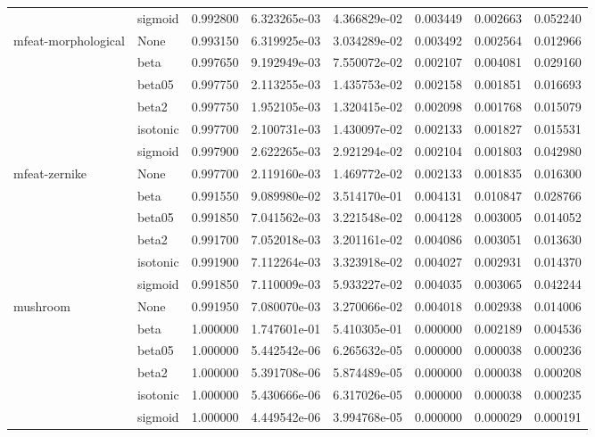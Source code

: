 \begin{tabular}{llrrrrrr}
        & sigmoid &  0.992800 &  6.323265e-03 &  4.366829e-02 &  0.003449 &  0.002663 &  0.052240 \\
mfeat-morphological & None &  0.993150 &  6.319925e-03 &  3.034289e-02 &  0.003492 &  0.002564 &  0.012966 \\
        & beta &  0.997650 &  9.192949e-03 &  7.550072e-02 &  0.002107 &  0.004081 &  0.029160 \\
        & beta05 &  0.997750 &  2.113255e-03 &  1.435753e-02 &  0.002158 &  0.001851 &  0.016693 \\
        & beta2 &  0.997750 &  1.952105e-03 &  1.320415e-02 &  0.002098 &  0.001768 &  0.015079 \\
        & isotonic &  0.997700 &  2.100731e-03 &  1.430097e-02 &  0.002133 &  0.001827 &  0.015531 \\
        & sigmoid &  0.997900 &  2.622265e-03 &  2.921294e-02 &  0.002104 &  0.001803 &  0.042980 \\
mfeat-zernike & None &  0.997700 &  2.119160e-03 &  1.469772e-02 &  0.002133 &  0.001835 &  0.016300 \\
        & beta &  0.991550 &  9.089980e-02 &  3.514170e-01 &  0.004131 &  0.010847 &  0.028766 \\
        & beta05 &  0.991850 &  7.041562e-03 &  3.221548e-02 &  0.004128 &  0.003005 &  0.014052 \\
        & beta2 &  0.991700 &  7.052018e-03 &  3.201161e-02 &  0.004086 &  0.003051 &  0.013630 \\
        & isotonic &  0.991900 &  7.112264e-03 &  3.323918e-02 &  0.004027 &  0.002931 &  0.014370 \\
        & sigmoid &  0.991850 &  7.110009e-03 &  5.933227e-02 &  0.004035 &  0.003065 &  0.042244 \\
mushroom & None &  0.991950 &  7.080070e-03 &  3.270066e-02 &  0.004018 &  0.002938 &  0.014006 \\
        & beta &  1.000000 &  1.747601e-01 &  5.410305e-01 &  0.000000 &  0.002189 &  0.004536 \\
        & beta05 &  1.000000 &  5.442542e-06 &  6.265632e-05 &  0.000000 &  0.000038 &  0.000236 \\
        & beta2 &  1.000000 &  5.391708e-06 &  5.874489e-05 &  0.000000 &  0.000038 &  0.000208 \\
        & isotonic &  1.000000 &  5.430666e-06 &  6.317026e-05 &  0.000000 &  0.000038 &  0.000235 \\
        & sigmoid &  1.000000 &  4.449542e-06 &  3.994768e-05 &  0.000000 &  0.000029 &  0.000191 \\

\end{tabular}
